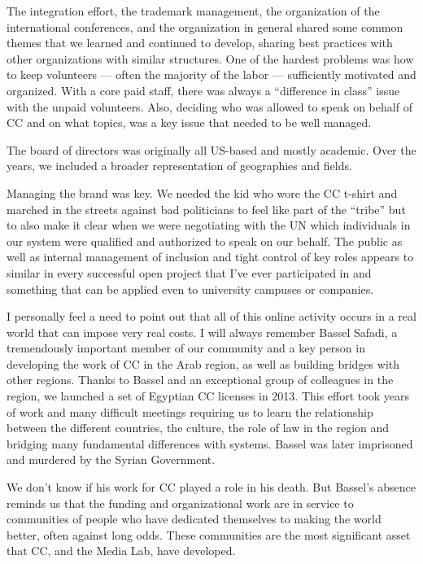The integration effort, the trademark management, the organization of the international conferences, and the organization in general shared some common themes that we learned and continued to develop, sharing best practices with other organizations with similar structures. One of the hardest problems was how to keep volunteers --- often the majority of the labor --- sufficiently motivated and organized. With a core paid staff, there was always a ``difference in class'' issue with the unpaid volunteers. Also, deciding who was allowed to speak on behalf of \ac{CC} and on what topics, was a key issue that needed to be well managed.

The board of directors was originally all US-based and mostly academic. Over the years, we included a broader representation of geographies and fields.

Managing the brand was key. We needed the kid who wore the \ac{CC} t-shirt and marched in the streets against bad politicians to feel like part of the ``tribe'' but to also make it clear when we were negotiating with the UN which individuals in our system were qualified and authorized to speak on our behalf. The public as well as internal management of inclusion and tight control of key roles appears to similar in every successful open project that I've ever participated in and something that can be applied even to university campuses or companies.

I personally feel a need to point out that all of this online activity occurs in a real world that can impose very real costs. I will always remember Bassel Safadi, a tremendously important member of our community and a key person in developing the work of \ac{CC} in the Arab region, as well as building bridges with other regions. Thanks to Bassel and an exceptional group of colleagues in the region, we launched a set of Egyptian \ac{CC} licenses in 2013. This effort took years of work and many difficult meetings requiring us to learn the relationship between the different countries, the culture, the role of law in the region and bridging many fundamental differences with systems. Bassel was later imprisoned and murdered by the Syrian Government.

We don't know if his work for \ac{CC} played a role in his death. But Bassel's absence reminds us that the funding and organizational work are in service to communities of people who have dedicated themselves to making the world better, often against long odds. These communities are the most significant asset that \ac{CC}, and the Media Lab, have developed.

